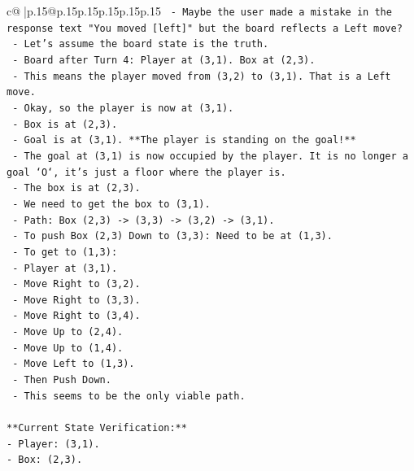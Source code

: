 \documentclass{article}
\begin{document}
{\begin{supertabular}{c@{$\;$}|p{.15\linewidth}@{}p{.15\linewidth}p{.15\linewidth}p{.15\linewidth}p{.15\linewidth}p{.15\linewidth}}
{{{\texttt{            {-} Maybe the user made a mistake in the response text "You moved {[}left{]}" but the board reflects a Left move?} \\
\texttt{            {-} Let's assume the board state is the truth.} \\
\texttt{            {-} Board after Turn 4: Player at (3,1). Box at (2,3).} \\
\texttt{            {-} This means the player moved from (3,2) to (3,1). That is a Left move.} \\
\texttt{            {-} Okay, so the player is now at (3,1).} \\
\texttt{            {-} Box is at (2,3).} \\
\texttt{            {-} Goal is at (3,1). **The player is standing on the goal!**} \\
\texttt{            {-} The goal at (3,1) is now occupied by the player. It is no longer a goal `O`, it's just a floor where the player is.} \\
\texttt{            {-} The box is at (2,3).} \\
\texttt{            {-} We need to get the box to (3,1).} \\
\texttt{            {-} Path: Box (2,3) {-}> (3,3) {-}> (3,2) {-}> (3,1).} \\
\texttt{            {-} To push Box (2,3) Down to (3,3): Need to be at (1,3).} \\
\texttt{            {-} To get to (1,3):} \\
\texttt{              {-} Player at (3,1).} \\
\texttt{              {-} Move Right to (3,2).} \\
\texttt{              {-} Move Right to (3,3).} \\
\texttt{              {-} Move Right to (3,4).} \\
\texttt{              {-} Move Up to (2,4).} \\
\texttt{              {-} Move Up to (1,4).} \\
\texttt{              {-} Move Left to (1,3).} \\
\texttt{            {-} Then Push Down.} \\
\texttt{            {-} This seems to be the only viable path.} \\
\\ 
\texttt{**Current State Verification:**} \\
\texttt{{-} Player: (3,1).} \\
\texttt{{-} Box: (2,3).} \\
}}}
\end{supertabular}}
\end{document}
